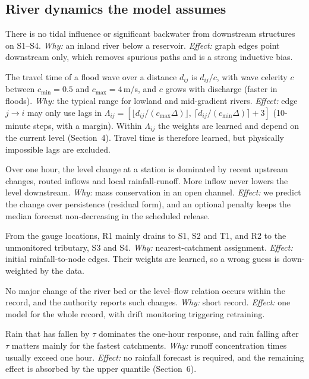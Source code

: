 \subsection*{River dynamics the model assumes}
\begin{description}[leftmargin=0.9cm, style=nextline]
\item[A7 Downstream-only propagation.] There is no tidal influence or significant backwater from
downstream structures on S1--S4. \emph{Why:} an inland river below a reservoir. \emph{Effect:} graph
edges point downstream only, which removes spurious paths and is a strong inductive bias.
\item[A8 Bounded, state-dependent travel times.] The travel time of a flood wave over a distance
$d_{ij}$ is $d_{ij}/c$, with wave celerity $c$ between $c_{\min}=0.5$ and $c_{\max}=4$\,m/s, and $c$
grows with discharge (faster in floods). \emph{Why:} the typical range for lowland and mid-gradient
rivers. \emph{Effect:} edge $j\to i$ may only use lags in
$\Lambda_{ij}=[\lfloor d_{ij}/(c_{\max}\Delta)\rfloor,\ \lceil d_{ij}/(c_{\min}\Delta)\rceil+3]$
(10-minute steps, with a margin). Within $\Lambda_{ij}$ the weights are learned and depend on the
current level (Section~4). Travel time is therefore learned, but physically impossible lags are
excluded.
\item[A9 Smooth, monotone response.] Over one hour, the level change at a station is dominated by
recent upstream changes, routed inflows and local rainfall-runoff. More inflow never lowers the
level downstream. \emph{Why:} mass conservation in an open channel. \emph{Effect:} we predict the
change over persistence (residual form), and an optional penalty keeps the median forecast
non-decreasing in the scheduled release.
\item[A10 Rainfall representativeness.] From the gauge locations, R1 mainly drains to S1, S2 and T1,
and R2 to the unmonitored tributary, S3 and S4. \emph{Why:} nearest-catchment assignment.
\emph{Effect:} initial rainfall-to-node edges. Their weights are learned, so a wrong guess is
down-weighted by the data.
\item[A11 Stationary channel.] No major change of the river bed or the level--flow relation occurs within the
record, and the authority reports such changes. \emph{Why:} short record. \emph{Effect:} one model
for the whole record, with drift monitoring triggering retraining.
\item[A12 Rain after issuance is secondary within one hour.] Rain that has fallen by $\tau$ dominates
the one-hour response, and rain falling after $\tau$ matters mainly for the fastest catchments.
\emph{Why:} runoff concentration times usually exceed one hour. \emph{Effect:} no rainfall forecast
is required, and the remaining effect is absorbed by the upper quantile (Section~6).
\end{description}
